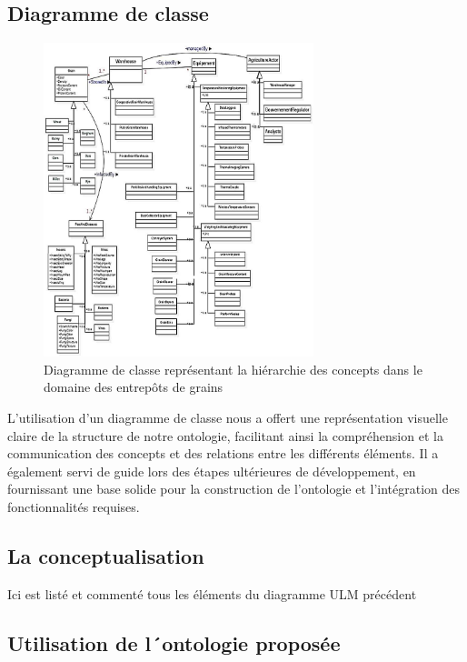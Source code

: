 \documentclass{article}
\begin{document}
	\subsection{Diagramme de classe}
	\begin{figure}[h]
		\centering
		\includegraphics[width=0.7\textwidth]{uml.png}
		\caption{Diagramme de classe représentant la hiérarchie des concepts dans le domaine des entrepôts de grains}
		\label{fig:votre_image}
	\end{figure}
	
	L'utilisation d'un diagramme de classe nous a offert une représentation visuelle claire de
	la structure de notre ontologie, facilitant ainsi la compréhension et la communication des
	concepts et des relations entre les différents éléments. Il a également servi de guide lors des
	étapes ultérieures de développement, en fournissant une base solide pour la construction de
	l'ontologie et l'intégration des fonctionnalités requises.
	
	\subsection{La conceptualisation}
	Ici est listé et commenté tous les éléments du diagramme ULM précédent
	
	\subsection{Utilisation de l´ontologie proposée}
\end{document}
